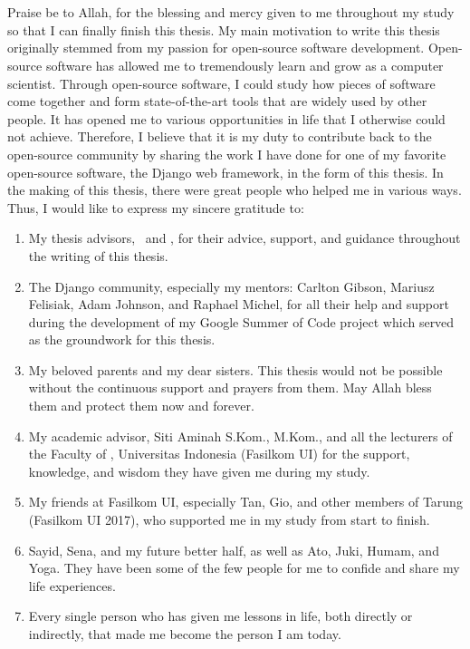 \chapter*{\kataPengantar}

Praise be to Allah, for the blessing and mercy given to me throughout my study
so that I can finally finish this thesis. My main motivation to write this
thesis originally stemmed from my passion for open-source software development.
Open-source software has allowed me to tremendously learn and grow as a
computer scientist. Through open-source software, I could study how pieces of
software come together and form state-of-the-art tools that are widely used by
other people. It has opened me to various opportunities in life that I
otherwise could not achieve. Therefore, I believe that it is my duty to
contribute back to the open-source community by sharing the work I have done
for one of my favorite open-source software, the Django web framework, in the
form of this thesis. In the making of this thesis, there were great people who
helped me in various ways. Thus, I would like to express my sincere gratitude
to:

\begin{enumerate}
    \item My thesis advisors, \pembimbingSatu\ and \pembimbingDua, for their
          advice, support, and guidance throughout the writing of this thesis.
    \item The Django community, especially my mentors: Carlton Gibson, Mariusz
          Felisiak, Adam Johnson, and Raphael Michel, for all their help and
          support during the development of my Google Summer of Code project
          which served as the groundwork for this thesis.
    \item My beloved parents and my dear sisters. This thesis would not be
		      possible without the continuous support and prayers from them. May
          Allah bless them and protect them now and forever.
    \item My academic advisor, Siti Aminah S.Kom., M.Kom., and all the
          lecturers of the Faculty of \fakultas, Universitas Indonesia
          (Fasilkom UI) for the support, knowledge, and wisdom they have given
          me during my study.
    \item My friends at Fasilkom UI, especially Tan, Gio, and other members of
		      Tarung (Fasilkom UI 2017), who supported me in my study from start to
					finish.
    \item Sayid, Sena, and my future better half, as well as Ato, Juki, Humam,
		      and Yoga. They have been some of the few people for me to confide and
					share my life experiences.
    \item Every single person who has given me lessons in life, both directly
          or indirectly, that made me become the person I am today.
\end{enumerate}

